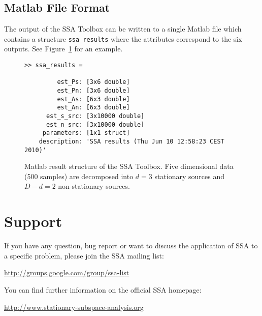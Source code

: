 \documentclass{article}
\newcommand{\1}{\ensuremath{\mathds{1}}}
\newcommand{\0}{\ensuremath{0}}
\begin{document}
\subsection{Matlab File Format}

The output of the SSA Toolbox can be written to a single Matlab file which contains
a structure \texttt{ssa\_results} where the attributes correspond to the six outputs. 
See Figure~\ref{fig:ex_matlab_res} for an example.

\begin{figure}[h]
\centering
\begin{boxedminipage}{12cm}
\begin{verbatim}
>> ssa_results = 

         est_Ps: [3x6 double]
         est_Pn: [3x6 double]
         est_As: [6x3 double]
         est_An: [6x3 double]
      est_s_src: [3x10000 double]
      est_n_src: [3x10000 double]
     parameters: [1x1 struct]
    description: 'SSA results (Thu Jun 10 12:58:23 CEST 2010)'
\end{verbatim}
\end{boxedminipage}
\caption{
Matlab result structure of the SSA Toolbox. Five dimensional data (500 samples) 
are decomposed into $d = 3$ stationary sources and $D-d = 2$ non-stationary sources.
\label{fig:ex_matlab_res}
}
\end{figure}

\section{Support}

If you have any question, bug report or want to discuss the application of SSA
to a specific problem, please join the SSA mailing list:
\begin{center}
        \url{http://groups.google.com/group/ssa-list}
\end{center}
You can find further
information on the official SSA homepage: 
\begin{center}
	\url{http://www.stationary-subspace-analysis.org}
\end{center}



\end{document}
